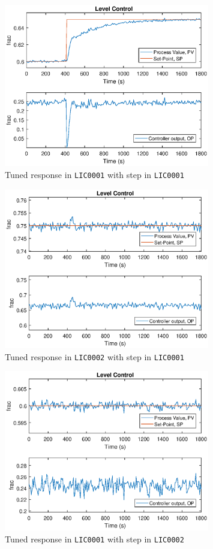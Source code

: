 \documentclass[a4paper]{scrartcl}
\begin{document}
\begin{figure}[ht!]
	\centering
	\includegraphics[width=0.8\textwidth]{fig/tuned/LIC0001_step1_tuned.eps}
	\caption{Tuned response in \texttt{LIC0001} with step in \texttt{LIC0001}}
	\label{fig:5b1}
\end{figure}
\begin{figure}[ht!]
	\centering
	\includegraphics[width=0.8\textwidth]{fig/tuned/LIC0002_step1_tuned.eps}
	\caption{Tuned response in \texttt{LIC0002} with step in \texttt{LIC0001}}
	\label{fig:5b2}
\end{figure}
\begin{figure}[ht!]
	\centering
	\includegraphics[width=0.8\textwidth]{fig/tuned/LIC0001_step2_tuned.eps}
	\caption{Tuned response in \texttt{LIC0001} with step in \texttt{LIC0002}}
	\label{fig:5b3}
\end{figure}
\end{document}
